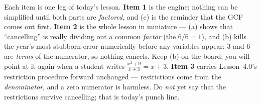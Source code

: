 \documentclass[10pt]{article}
\begin{document}
\begin{teachernote}
Each item is one leg of today's lesson. \textbf{Item 1} is the engine: nothing can be simplified
until both parts are \emph{factored}, and (c) is the reminder that the GCF comes out first.
\textbf{Item 2} is the whole lesson in miniature --- (a) shows that ``cancelling'' is really
dividing out a common \emph{factor} (the $6/6=1$), and (b) kills the year's most stubborn error
numerically before any variables appear: $3$ and $6$ are \emph{terms} of the numerator, so nothing
cancels. Keep (b) on the board; you will point at it again when a student writes
$\frac{x^2+9}{x+3}=x+3$. \textbf{Item 3} carries Lesson~4.0's restriction procedure forward
unchanged --- restrictions come from the \emph{denominator}, and a zero numerator is harmless.
Do \emph{not} yet say that the restrictions survive cancelling; that is today's punch line.
\end{teachernote}
\end{document}

